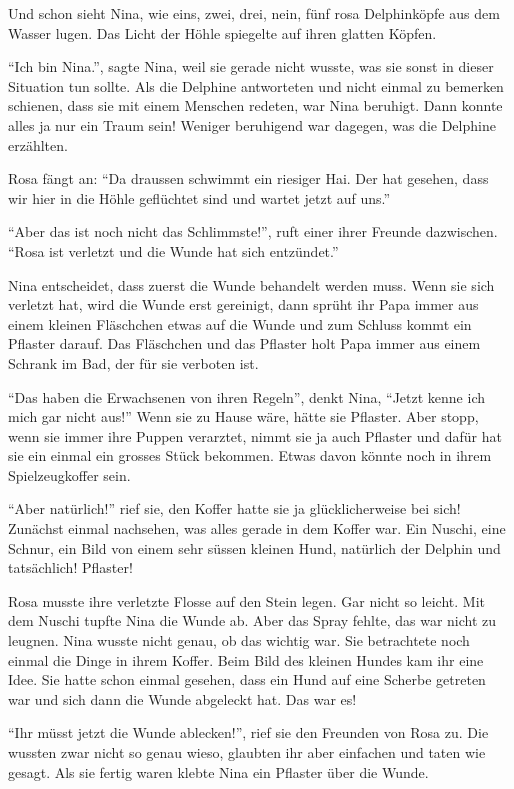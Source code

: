 Und schon sieht Nina, wie eins, zwei, drei, nein, fünf rosa Delphinköpfe aus dem Wasser lugen. Das Licht der Höhle spiegelte auf ihren glatten Köpfen. 

\enquote{Ich bin Nina.}, sagte Nina, weil sie gerade nicht wusste, was sie sonst in dieser Situation tun sollte. Als die Delphine antworteten und nicht einmal zu bemerken schienen, dass sie mit einem Menschen redeten, war Nina beruhigt. Dann konnte alles ja nur ein Traum sein! Weniger beruhigend war dagegen, was die Delphine erzählten.

Rosa fängt an: \enquote{Da draussen schwimmt ein riesiger Hai. Der hat gesehen, dass wir hier in die Höhle geflüchtet sind und wartet jetzt auf uns.}

\enquote{Aber das ist noch nicht das Schlimmste!}, ruft einer ihrer Freunde dazwischen. \enquote{Rosa ist verletzt und die Wunde hat sich entzündet.}

Nina entscheidet, dass zuerst die Wunde behandelt werden muss. Wenn sie sich verletzt hat, wird die Wunde erst gereinigt, dann sprüht ihr Papa immer aus einem kleinen Fläschchen etwas auf die Wunde und zum Schluss kommt ein Pflaster darauf. Das Fläschchen und das Pflaster holt Papa immer aus einem Schrank im Bad, der für sie verboten ist. 

\enquote{Das haben die Erwachsenen von ihren Regeln}, denkt Nina, \enquote{Jetzt kenne ich mich gar nicht aus!} Wenn sie zu Hause wäre, hätte sie Pflaster. Aber stopp, wenn sie immer ihre Puppen verarztet, nimmt sie ja auch Pflaster und dafür hat sie ein einmal ein grosses Stück bekommen. Etwas davon könnte noch in ihrem Spielzeugkoffer sein.

\enquote{Aber natürlich!} rief sie, den Koffer hatte sie ja glücklicherweise bei sich! Zunächst einmal nachsehen, was alles gerade in dem Koffer war. Ein Nuschi, eine Schnur, ein Bild von einem sehr süssen kleinen Hund, natürlich der Delphin und tatsächlich! Pflaster! 

Rosa musste ihre verletzte Flosse auf den Stein legen. Gar nicht so leicht. Mit dem Nuschi tupfte Nina die Wunde ab. Aber das Spray fehlte, das war nicht zu leugnen. Nina wusste nicht genau, ob das wichtig war. Sie betrachtete noch einmal die Dinge in ihrem Koffer. Beim Bild des kleinen Hundes kam ihr eine Idee. Sie hatte schon einmal gesehen, dass ein Hund auf eine Scherbe getreten war und sich dann die Wunde abgeleckt hat. Das war es!

\enquote{Ihr müsst jetzt die Wunde ablecken!}, rief sie den Freunden von Rosa zu. Die wussten zwar nicht so genau wieso, glaubten ihr aber einfachen und taten wie gesagt. Als sie fertig waren klebte Nina ein Pflaster über die Wunde.

